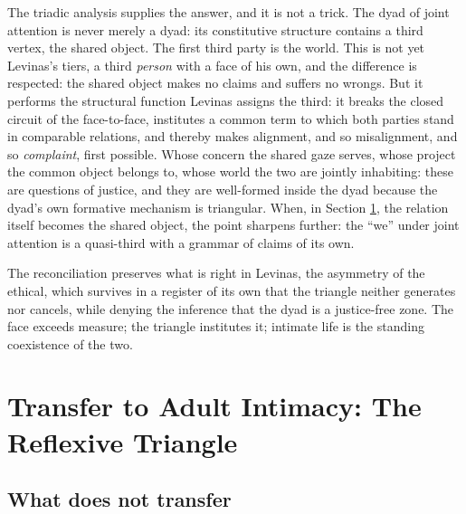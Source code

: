 \documentclass[11pt,a4paper]{article}
\theoremstyle{seriesthm}
\begin{document}
The triadic analysis supplies the answer, and it is not a trick. The dyad of joint attention is never merely a dyad: its constitutive structure contains a third vertex, the shared object. The first third party is the world. This is not yet Levinas's tiers, a third \emph{person} with a face of his own, and the difference is respected: the shared object makes no claims and suffers no wrongs. But it performs the structural function Levinas assigns the third: it breaks the closed circuit of the face-to-face, institutes a common term to which both parties stand in comparable relations, and thereby makes alignment, and so misalignment, and so \emph{complaint}, first possible. Whose concern the shared gaze serves, whose project the common object belongs to, whose world the two are jointly inhabiting: these are questions of justice, and they are well-formed inside the dyad because the dyad's own formative mechanism is triangular. When, in Section \ref{p05:sec:transfer}, the relation itself becomes the shared object, the point sharpens further: the ``we'' under joint attention is a quasi-third with a grammar of claims of its own.

The reconciliation preserves what is right in Levinas, the asymmetry of the ethical, which survives in a register of its own that the triangle neither generates nor cancels, while denying the inference that the dyad is a justice-free zone. The face exceeds measure; the triangle institutes it; intimate life is the standing coexistence of the two.

\section{Transfer to Adult Intimacy: The Reflexive Triangle}
\label{p05:sec:transfer}

\subsection{What does not transfer}
\end{document}
